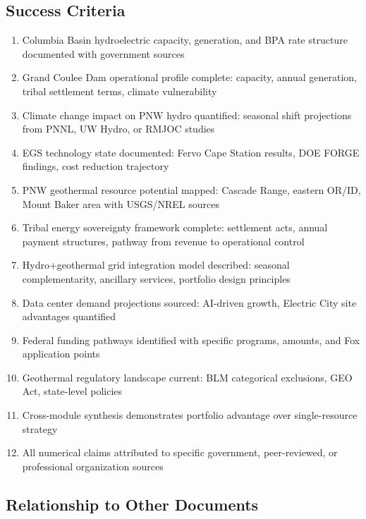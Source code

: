 \documentclass[11pt,letterpaper]{article}
\begin{document}
\subsection{Success Criteria}

\begin{enumerate}[leftmargin=2em]
\item Columbia Basin hydroelectric capacity, generation, and BPA rate structure documented with government sources
\item Grand Coulee Dam operational profile complete: capacity, annual generation, tribal settlement terms, climate vulnerability
\item Climate change impact on PNW hydro quantified: seasonal shift projections from PNNL, UW Hydro, or RMJOC studies
\item EGS technology state documented: Fervo Cape Station results, DOE FORGE findings, cost reduction trajectory
\item PNW geothermal resource potential mapped: Cascade Range, eastern OR/ID, Mount Baker area with USGS/NREL sources
\item Tribal energy sovereignty framework complete: settlement acts, annual payment structures, pathway from revenue to operational control
\item Hydro+geothermal grid integration model described: seasonal complementarity, ancillary services, portfolio design principles
\item Data center demand projections sourced: AI-driven growth, Electric City site advantages quantified
\item Federal funding pathways identified with specific programs, amounts, and Fox application points
\item Geothermal regulatory landscape current: BLM categorical exclusions, GEO Act, state-level policies
\item Cross-module synthesis demonstrates portfolio advantage over single-resource strategy
\item All numerical claims attributed to specific government, peer-reviewed, or professional organization sources
\end{enumerate}

\subsection{Relationship to Other Documents}
\end{document}
